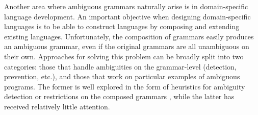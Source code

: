 \documentclass[acmsmall,review,anonymous]{acmart}\settopmatter{printfolios=true,printccs=false,printacmref=false}
\begin{document}
Another area where ambiguous grammars naturally arise is
in domain-specific language development.  An important
objective when designing domain-specific languages is to be able to construct
languages by composing and extending existing
languages.
Unfortunately, the composition of
%
grammars easily produces
an ambiguous grammar, even if the original grammars are all
unambiguous on their own. Approaches for solving this problem can be broadly split
into two categories: those that handle ambiguities on the
grammar-level (detection, prevention, etc.), and those that work on
particular examples of ambiguous programs. The former is well explored
in the form of heuristics for ambiguity detection
\cite{bastenAmbiguityDetectionProgramming2011,axelssonAnalyzingContextFreeGrammars2008,brabrandAnalyzingAmbiguityContextFree2007}
or restrictions on the composed grammars
\cite{kaminskiModularWellDefinednessAnalysis2013}, while the
latter has received relatively little attention.




\end{document}
